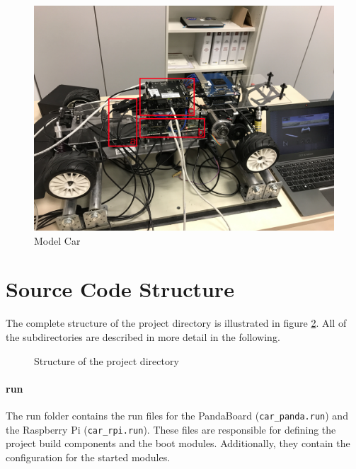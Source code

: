 \begin{figure}[h]
       \centering
       \includegraphics[trim={0 10cm 0 30cm},clip,width=1.0\linewidth]{images/model}
       \caption{Model Car}
       \label{fig:model}
\end{figure}




\section{Source Code Structure}
\label{sec:scs}
The complete structure of the project directory is illustrated in figure \ref{fig:structure}. All of the subdirectories are described in more detail in the following. \\

\begin{figure}[h]
    \caption{Structure of the project directory}
    \label{fig:structure}
\end{figure}


\paragraph{run}
The run folder contains the run files for the PandaBoard (\texttt{car\_panda.run}) and the Raspberry Pi (\texttt{car\_rpi.run}).
These files are responsible for defining the project build components and the boot modules. Additionally, they contain the configuration for the started modules.

